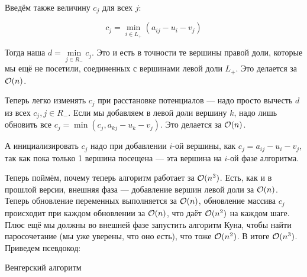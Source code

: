 Введём также величину $c_j$ для всех $j$:

\[
  c_j = \min\limits_{i \in L_+} (a_{ij} - u_i - v_j)
\]

Тогда наша $d = \min\limits_{j \in R_-} c_j$. Это и есть в точности те вершины правой доли,
которые мы ещё не посетили, соединенных с вершинами левой доли $L_+$. Это делается
за $\mathcal{O}(n)$.

Теперь легко изменять $c_j$ при расстановке потенциалов --- надо просто вычесть
$d$ из всех $c_j, j \in R_-$. Если мы добавляем в левой доли вершину $k$, надо лишь
обновить все $c_j = \min(c_j, a_{kj} - u_k - v_j)$. Это делается за $\mathcal{O}(n)$.

А инициализировать $c_j$ надо
при добавлении $i$-ой вершины, как $c_j = a_{ij} - u_i - v_j$, так как пока
только 1 вершина посещена --- эта вершина на $i$-ой фазе алгоритма.

Теперь поймём, почему теперь алгоритм работает за $\mathcal{O}(n^3)$. Есть, как и в
прошлой версии, внешняя фаза --- добавление вершин левой доли за $\mathcal{O}(n)$. Теперь
обновление переменных выполняется за $\mathcal{O}(n)$, обновление массива $c_j$ происходит
при каждом обновлении за $\mathcal{O}(n)$, что даёт $\mathcal{O}(n^2)$ на каждом шаге. Плюс
ещё мы должны во внешней фазе запустить алгоритм Куна, чтобы найти паросочетание (мы
уже уверены, что оно есть), что тоже $\mathcal{O}(n^2)$. В итоге $\mathcal{O}(n^3)$. Приведем
псевдокод:

\begin{algorithm}[H]
  \caption{Венгерский алгоритм}
    \begin{algorithmic}[1]
       
         
           
           
           
           
             
               
                 
                 
                 
              \Else
                 
                 
              \EndIf
            \EndIf
          \EndFor
        \EndWhile
      \EndFor
    \end{algorithmic}
\end{algorithm}

